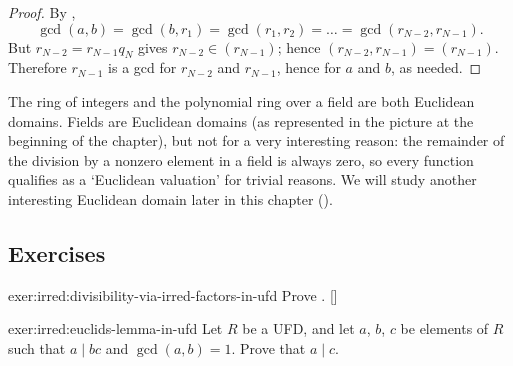 \begin{proof}
  By ,
  \[\gcd(a, b) = \gcd(b, r_1) = \gcd(r_1, r_2) = \dots =
    \gcd(r_{N-2}, r_{N-1}).\] But $r_{N-2} = r_{N-1} q_N$ gives
  $r_{N-2} \in (r_{N-1})$; hence $(r_{N-2}, r_{N-1}) =
  (r_{N-1})$. Therefore $r_{N-1}$ is a gcd for $r_{N-2}$ and
  $r_{N-1}$, hence for $a$ and $b$, as needed.
\end{proof}
The ring of integers and the polynomial ring over a field are both
Euclidean domains. Fields are Euclidean domains (as represented in the
picture at the beginning of the chapter), but not for a very
interesting reason: the remainder of the division by a nonzero element
in a field is always zero, so every function qualifies as a `Euclidean
valuation' for trivial reasons. We will study another interesting
Euclidean domain later in this chapter
().

\subsection*{Exercises}

\begin{exer}{}{exer:irred:divisibility-via-irred-factors-in-ufd}
  \exerused{} Prove
  . []
\end{exer}

\begin{exer}{}{exer:irred:euclids-lemma-in-ufd}
  Let $R$ be a UFD, and let $a$, $b$, $c$ be elements of $R$ such that
  $a \mid bc$ and $\gcd(a, b) = 1$. Prove that $a \mid c$.
\end{exer}

